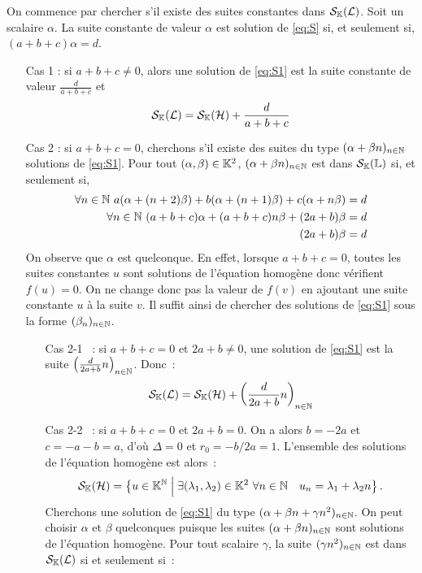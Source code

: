 On commence par chercher s'il existe des suites constantes dans \(\mathcal{S}_{\mathbb{K}}(\mathcal{L})\). Soit un scalaire \(\alpha\). La suite constante de valeur \(\alpha\) est solution de \eqref{eq:S} si, et seulement si, \((a+b+c)\alpha=d\).
\begin{itemize}
\item[Cas 1] : si \(a+b+c \neq 0\), alors une solution de \eqref{eq:S1} est la suite constante de valeur \(\frac{d}{a+b+c}\) et
  \begin{equation}
    \mathcal{S}_{\mathbb{K}}(\mathcal{L}) = \mathcal{S}_{\mathbb{K}}(\mathcal{H}) +\frac{d}{a+b+c}
  \end{equation}
\item[Cas 2] : si \(a+b+c=0\), cherchons s'il existe des suites du type \((\alpha+\beta n)_{n \in \mathbb{N}}\) solutions de \eqref{eq:S1}. Pour tout \((\alpha,\beta) \in \mathbb{K}^2\), \((\alpha + \beta n)_{n \in \mathbb{N}}\) est dans \(\mathcal{S}_{\mathbb{K}}(\mathbb{L})\) si, et seulement si,
  \begin{align}
    \forall n \in \mathbb{N} \ a(\alpha +(n+2)\beta)+b(\alpha+(n+1)\beta)+c(\alpha +n\beta) &=d \\
    \forall n \in \mathbb{N} \ (a+b+c)\alpha +(a+b+c)n\beta +(2a+b)\beta &=d\\
    (2a+b)\beta &=d
  \end{align}
  On observe que \(\alpha\) est quelconque. En effet, lorsque \(a+b+c=0\), toutes les suites constantes \(u\) sont solutions de l'équation homogène donc vérifient \(f(u)=0\). On ne change donc pas la valeur de \(f(v)\) en ajoutant une suite constante \(u\) à la suite \(v\). Il suffit ainsi de chercher des solutions de \eqref{eq:S1} sous la forme \((\beta_n)_{n \in \mathbb{N}}\).
  \begin{itemize}
  \item[Cas 2-1]~: si \(a+b+c=0\) et \(2a+b \neq 0\), une solution de \eqref{eq:S1} est la suite \(\left(\frac{d}{2a+b}n\right)_{n \in \mathbb{N}}\). Donc~:
    \begin{equation}
      \mathcal{S}_{\mathbb{K}}(\mathcal{L}) = \mathcal{S}_{\mathbb{K}}(\mathcal{H}) + \left(\frac{d}{2a+b}n\right)_{n \in \mathbb{N}}
    \end{equation}
  \item[Cas 2-2]~: si \(a+b+c=0\) et \(2a+b = 0\). On a alors \(b=-2a\) et \(c=-a-b=a\), d'où \(\Delta=0\) et \(r_0=-b/2a=1\). L'ensemble des solutions de l'équation homogène est alors~:
    \begin{equation}
      \mathcal{S}_{\mathbb{K}}(\mathcal{H}) = \left\{u \in \mathbb{K}^{\mathbb{N}}\mathrel{}\middle|\mathrel{}\exists (\lambda_1, \lambda_2) \in \mathbb{K}^2 \ \forall n \in \mathbb{N} \quad u_n = \lambda_1+\lambda_2 n\right\}.
    \end{equation}
    Cherchons une solution de \eqref{eq:S1} du type \((\alpha+\beta n + \gamma n^2)_{n \in \mathbb{N}}\). On peut choisir \(\alpha\) et \(\beta\) quelconques puisque les suites \((\alpha+\beta n)_{n \in \mathbb{N}}\) sont solutions de l'équation homogène. Pour tout scalaire \(\gamma\), la suite \((\gamma n^2)_{n \in \mathbb{N}}\) est dans \(\mathcal{S}_{\mathbb{K}}(\mathcal{L})\) si et seulement si~:

\end{itemize}
\end{itemize}
